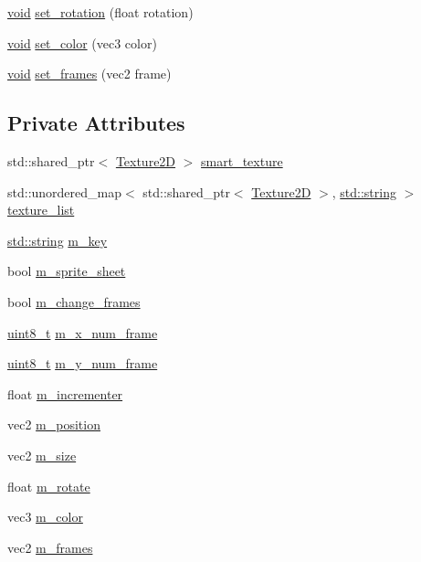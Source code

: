 \begin{DoxyCompactItemize}
\item 
\hyperlink{imgui__impl__opengl3__loader_8h_ac668e7cffd9e2e9cfee428b9b2f34fa7}{void} \hyperlink{classsprite_ab95aac27f21039f0f8584343687e734b}{set\+\_\+rotation} (float rotation)
\item 
\hyperlink{imgui__impl__opengl3__loader_8h_ac668e7cffd9e2e9cfee428b9b2f34fa7}{void} \hyperlink{classsprite_a43c820290835b2ba00b789af65ad6dca}{set\+\_\+color} (vec3 color)
\item 
\hyperlink{imgui__impl__opengl3__loader_8h_ac668e7cffd9e2e9cfee428b9b2f34fa7}{void} \hyperlink{classsprite_a2ee0454b622030ee1f4a7d8d130db410}{set\+\_\+frames} (vec2 frame)
\end{DoxyCompactItemize}
\subsection*{Private Attributes}
\begin{DoxyCompactItemize}
\item 
std\+::shared\+\_\+ptr$<$ \hyperlink{classTexture2D}{Texture2D} $>$ \hyperlink{classsprite_a88c07efe1337b770a4a1f8a1fffe8834}{smart\+\_\+texture}
\item 
std\+::unordered\+\_\+map$<$ std\+::shared\+\_\+ptr$<$ \hyperlink{classTexture2D}{Texture2D} $>$, \hyperlink{imgui__impl__opengl3__loader_8h_ac83513893df92266f79a515488701770}{std\+::string} $>$ \hyperlink{classsprite_aa17ee337e7e0df44f042178b5e522751}{texture\+\_\+list}
\item 
\hyperlink{imgui__impl__opengl3__loader_8h_ac83513893df92266f79a515488701770}{std\+::string} \hyperlink{classsprite_a814c5905ffdd26f7a585d2eeec6a8d93}{m\+\_\+key}
\item 
bool \hyperlink{classsprite_a90713ede82ab2256a308feae3ec5e3eb}{m\+\_\+sprite\+\_\+sheet}
\item 
bool \hyperlink{classsprite_a29b0927a7303c9156b9caf753501db06}{m\+\_\+change\+\_\+frames}
\item 
\hyperlink{stdint_8h_aba7bc1797add20fe3efdf37ced1182c5}{uint8\+\_\+t} \hyperlink{classsprite_a70f53dec07ce080a3004925a850e4651}{m\+\_\+x\+\_\+num\+\_\+frame}
\item 
\hyperlink{stdint_8h_aba7bc1797add20fe3efdf37ced1182c5}{uint8\+\_\+t} \hyperlink{classsprite_a84ce0565b22ff655ff7cc54d6bc5a260}{m\+\_\+y\+\_\+num\+\_\+frame}
\item 
float \hyperlink{classsprite_aecbf0a0cd9ea195f174be3aaa921f057}{m\+\_\+incrementer}
\item 
vec2 \hyperlink{classsprite_a445b6161d96984e6054612134f25cb72}{m\+\_\+position}
\item 
vec2 \hyperlink{classsprite_a165e771f6553bed419a0a19a44a561ca}{m\+\_\+size}
\item 
float \hyperlink{classsprite_a0d9b789deca4f552207112656ef62363}{m\+\_\+rotate}
\item 
vec3 \hyperlink{classsprite_a6630a3c3ce65c8b35aad99e6799751d5}{m\+\_\+color}
\item 
vec2 \hyperlink{classsprite_a275ea7dc233e92f18aebef18c317638f}{m\+\_\+frames}
\end{DoxyCompactItemize}


